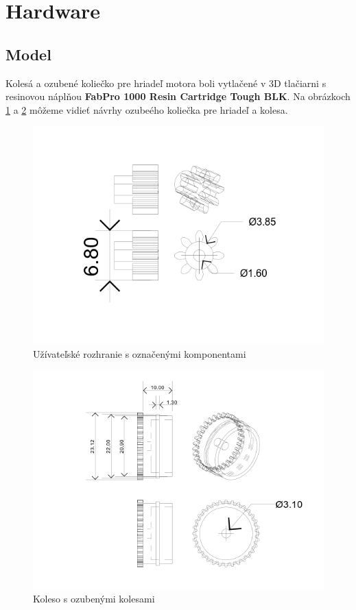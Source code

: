 
\section{Hardware}
\subsection{Model}
\label{sec:hardware}
Kolesá a ozubené koliečko pre hriadeľ motora boli vytlačené v 3D tlačiarni s resinovou náplňou \textbf{FabPro 1000 Resin Cartridge Tough BLK}. Na obrázkoch \ref{fig:gear} a \ref{fig:wheel_w_gear} môžeme vidieť návrhy ozubeého koliečka pre hriadeľ a kolesa. 

\begin{figure}[!htbp]
        \centering
        \includegraphics[scale=0.8]{includes/images/motor_gear.png}
        \caption{Užívateľské rozhranie s označenými komponentami}
        \label{fig:gear}
\end{figure}

\begin{figure}[!htbp]
        \centering
        \includegraphics[scale=0.8]{includes/images/wheel_w_gear_2_blueprint.png}
        \caption{Koleso s ozubenými kolesami}
        \label{fig:wheel_w_gear}
\end{figure}

